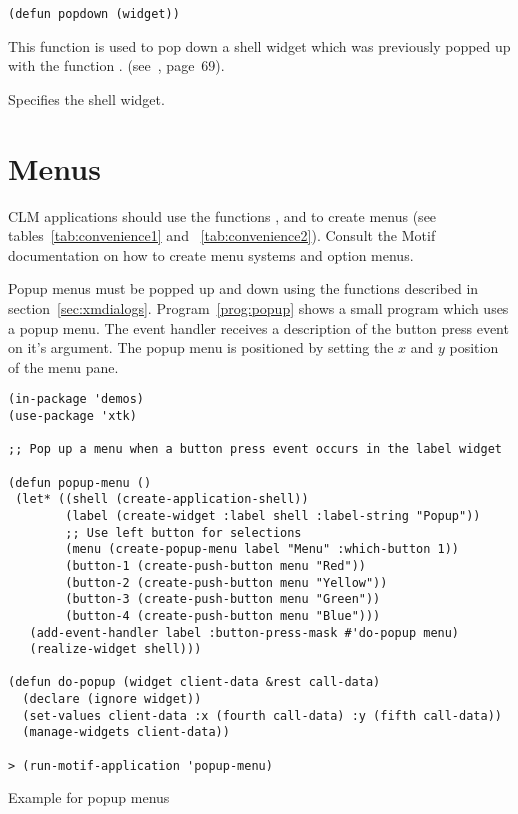 \begin{lispd}
\syntax\begin{verbatim}
(defun popdown (widget))
\end{verbatim}
\beschr This function is used to pop down a shell widget which was previously
popped up with the function .  (see~\cite{xtoolkit}, page~69).
\parameter
\begin{paramd}
 Specifies the shell widget.
\end{paramd}
\end{lispd}

\section{Menus}

CLM applications should use the functions ,
 and  to create menus
(see tables~\ref{tab:convenience1} and ~\ref{tab:convenience2}).
Consult the Motif documentation on how to create menu systems and option menus.

Popup menus must be popped up and down using the functions described in
section~\ref{sec:xmdialogs}. Program~\ref{prog:popup} shows a small program
which uses a popup menu. The event handler receives a description of the
button press event on it's  argument. The popup menu is 
positioned by setting the $x$ and $y$ position of the menu pane.

\begin{proglist}[htbp]
\fnsize\begin{verbatim}
(in-package 'demos)
(use-package 'xtk)

;; Pop up a menu when a button press event occurs in the label widget

(defun popup-menu ()
 (let* ((shell (create-application-shell))
        (label (create-widget :label shell :label-string "Popup"))
        ;; Use left button for selections
        (menu (create-popup-menu label "Menu" :which-button 1))
        (button-1 (create-push-button menu "Red"))
        (button-2 (create-push-button menu "Yellow"))
        (button-3 (create-push-button menu "Green"))
        (button-4 (create-push-button menu "Blue")))
   (add-event-handler label :button-press-mask #'do-popup menu)
   (realize-widget shell)))

(defun do-popup (widget client-data &rest call-data)
  (declare (ignore widget))
  (set-values client-data :x (fourth call-data) :y (fifth call-data))
  (manage-widgets client-data))

> (run-motif-application 'popup-menu)
\end{verbatim}\normalsize
\caption{\label{prog:popup}Example for popup menus}
\end{proglist}

